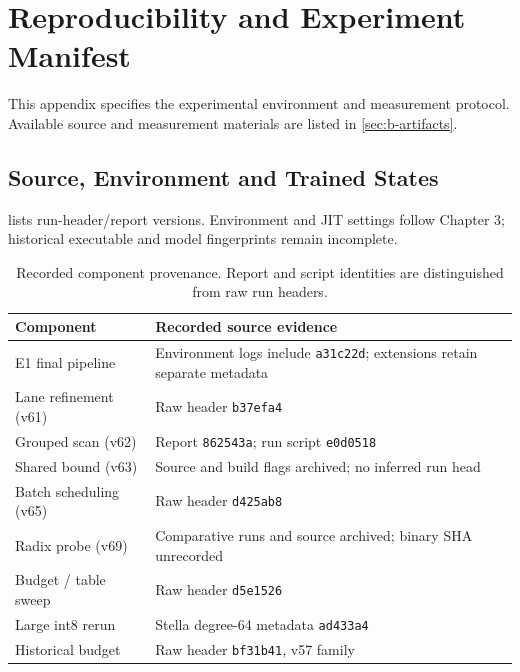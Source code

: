 \chapter{Reproducibility and Experiment Manifest}
\label{app:reproducibility}

This appendix specifies the experimental environment and measurement
protocol. Available source and measurement materials are listed in
\cref{sec:b-artifacts}.

\section{Source, Environment and Trained States}

 lists run-header/report versions. Environment and JIT settings follow Chapter 3; historical executable and model fingerprints remain incomplete.

\begin{table}[tbp]
\centering
\caption[Component and run provenance]{Recorded component provenance. Report and script identities
are distinguished from raw run headers.}
\label{tab:a-components}
\footnotesize\setlength{\tabcolsep}{4pt}
\begin{tabularx}{\linewidth}{@{}>{\raggedright\arraybackslash}p{.34\linewidth}>{\raggedright\arraybackslash}X@{}}
\toprule
Component & Recorded source evidence \\
\midrule
E1 final pipeline & Environment logs include \texttt{a31c22d}; extensions retain separate metadata \\
Lane refinement (v61) & Raw header \texttt{b37efa4} \\
Grouped scan (v62) & Report \texttt{862543a}; run script \texttt{e0d0518} \\
Shared bound (v63) & Source and build flags archived; no inferred run head \\
Batch scheduling (v65) & Raw header \texttt{d425ab8} \\
Radix probe (v69) & Comparative runs and source archived; binary SHA unrecorded \\
Budget / table sweep & Raw header \texttt{d5e1526} \\
Large int8 rerun & Stella degree-64 metadata \texttt{ad433a4} \\
Historical budget & Raw header \texttt{bf31b41}, v57 family \\
\bottomrule
\end{tabularx}
\end{table}

